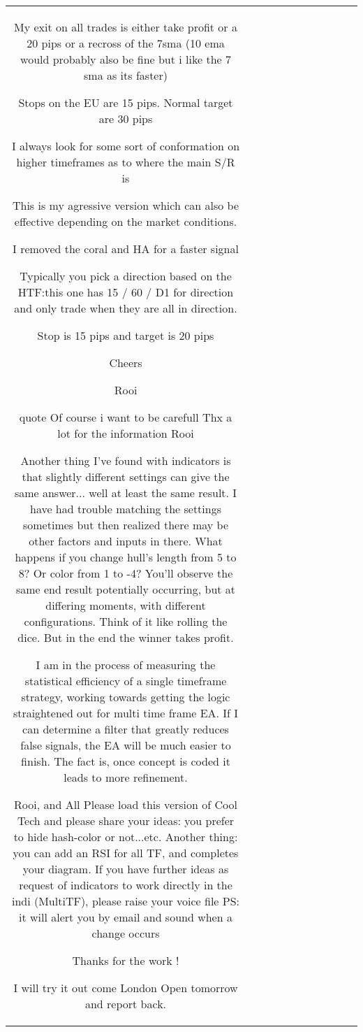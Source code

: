 \begin{table}[h!]
\begin{tabular}{|c|c|c|c|c|c|c|c|c|c|c|}
My exit on all trades is either take profit or a 20 pips or a recross of the 7sma (10 ema would probably also be fine but i like the 7 sma as its faster)

Stops on the EU are 15 pips. Normal target are 30 pips

I always look for some sort of conformation on higher timeframes as to where the main S/R is


This is my agressive version which can also be effective depending on the market conditions.

I removed the coral and HA for a faster signal

Typically you pick a direction based on the HTF:this one has 15 / 60 / D1 for direction and only trade when they are all in direction.

Stop is 15 pips and target is 20 pips

Cheers

Rooi


{quote} Of course i want to be carefull  Thx a lot for the information Rooi

Another thing I've found with indicators is that slightly different settings can give the same answer... well at least the same result. I have had trouble matching the settings sometimes but then realized there may be other factors and inputs in there. What happens if you change hull's length from 5 to 8? Or color from 1 to -4? You'll observe the same end result potentially occurring, but at differing moments, with different configurations. Think of it like rolling the dice. But in the end the winner takes profit.

I am in the process of measuring the statistical efficiency of a single timeframe strategy, working towards getting the logic straightened out for multi time frame EA. If I can determine a filter that greatly reduces false signals, the EA will be much easier to finish. The fact is, once concept is coded it leads to more refinement.

Rooi, and All Please load this version of Cool Tech and please share your ideas: you prefer to hide hash-color or not...etc. Another thing: you can add an RSI for all TF, and completes your diagram. If you have further ideas as request of indicators to work directly in the indi (MultiTF), please raise your voice {file} PS: it will alert you by email and sound when a change occurs

Thanks for the work !

I will try it out come London Open tomorrow and report back.


\end{tabular}
\end{table}
